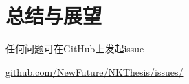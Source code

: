 \chapter{总结与展望}

任何问题可在GitHub上发起issue 

\href{https://github.com/NewFuture/NKThesis/issues/new}{github.com/NewFuture/NKThesis/issues/}